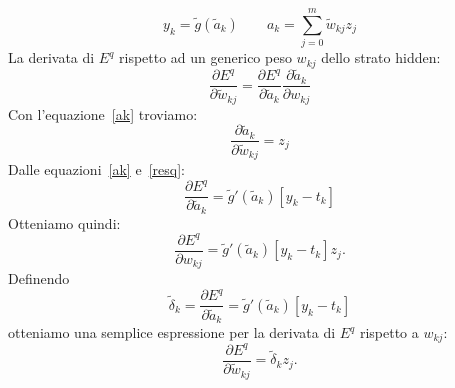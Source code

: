\documentclass[11pt,a4paper,twoside,
openright]{book}
\begin{document}
\begin{equation}
y_k=\tilde{g}(\tilde{a}_k) \qquad
 a_k=\sum\limits_{j=0}^m \tilde{w}_{kj}z_j
\label{ak}
\end{equation}
La derivata di $E^q$ rispetto ad un generico peso $w_{kj}$ dello strato hidden:
\begin{equation}
\frac{\partial E^q}{\partial \tilde{w}_{kj}}=\frac{\partial E^q}{\partial \tilde{a}_k}\frac{\partial \tilde{a}_k}{\partial w_{kj}}
\label{chain}
\end{equation}
Con l'equazione~\eqref{ak} troviamo:
\begin{equation}
\frac{\partial \tilde{a}_k}{\partial \tilde{w}_{kj}}=z_j
\label{chain1}
\end{equation}
Dalle equazioni~\eqref{ak} e~\eqref{resq}:
\begin{equation}
\frac{\partial E^q}{\partial \tilde{a}_k}=\tilde{g}'(\tilde{a}_k)[y_k-t_k]
\label{chain2}
\end{equation}
Otteniamo quindi:
\begin{equation}
\frac{\partial E^q}{\partial w_{kj}}=\tilde{g}'(\tilde{a}_k)[y_k-t_k]z_j.
\label{chain2}
\end{equation}
Definendo
\begin{equation}
\tilde{\delta}_k = \frac{\partial E^q}{\partial \tilde{a}_k}=\tilde{g}'(\tilde{a}_k)[y_k-t_k]
\label{delta}
\end{equation}
otteniamo una semplice espressione per la derivata di $E^q$ rispetto a $w_{kj}$:
\begin{equation}
\frac{\partial E^q}{\partial \tilde{w}_{kj}}=\tilde{\delta}_k z_j.
\label{deltaz}
\end{equation}
\end{document}
